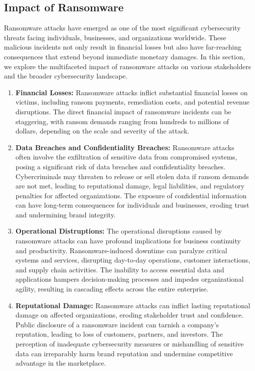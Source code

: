 \documentclass[12pt,letterpaper]{article}
\begin{document}
        \subsection{Impact of Ransomware}

        Ransomware attacks have emerged as one of the most significant cybersecurity threats facing individuals, businesses, and organizations worldwide. These malicious incidents not only result in financial losses but also have far-reaching consequences that extend beyond immediate monetary damages. In this section, we explore the multifaceted impact of ransomware attacks on various stakeholders and the broader cybersecurity landscape.

        \begin{enumerate}
            \item \textbf{Financial Losses:} Ransomware attacks inflict substantial financial losses on victims, including ransom payments, remediation costs, and potential revenue disruptions. The direct financial impact of ransomware incidents can be staggering, with ransom demands ranging from hundreds to millions of dollars, depending on the scale and severity of the attack. 

            \item \textbf{Data Breaches and Confidentiality Breaches:} Ransomware attacks often involve the exfiltration of sensitive data from compromised systems, posing a significant risk of data breaches and confidentiality breaches. Cybercriminals may threaten to release or sell stolen data if ransom demands are not met, leading to reputational damage, legal liabilities, and regulatory penalties for affected organizations. The exposure of confidential information can have long-term consequences for individuals and businesses, eroding trust and undermining brand integrity.

            \item \textbf{Operational Distruptions:} The operational disruptions caused by ransomware attacks can have profound implications for business continuity and productivity. Ransomware-induced downtime can paralyze critical systems and services, disrupting day-to-day operations, customer interactions, and supply chain activities. The inability to access essential data and applications hampers decision-making processes and impedes organizational agility, resulting in cascading effects across the entire enterprise.

            \item \textbf{Reputational Damage:} Ransomware attacks can inflict lasting reputational damage on affected organizations, eroding stakeholder trust and confidence. Public disclosure of a ransomware incident can tarnish a company's reputation, leading to loss of customers, partners, and investors. The perception of inadequate cybersecurity measures or mishandling of sensitive data can irreparably harm brand reputation and undermine competitive advantage in the marketplace.


\end{enumerate}
\end{document}
